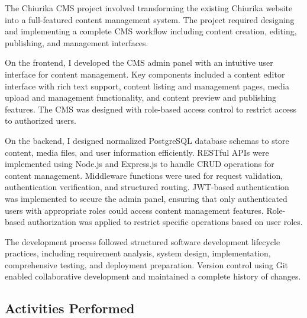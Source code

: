 The Chiurika CMS project involved transforming the existing Chiurika website into a full-featured content management system. The project required designing and implementing a complete CMS workflow including content creation, editing, publishing, and management interfaces.

On the frontend, I developed the CMS admin panel with an intuitive user interface for content management. Key components included a content editor interface with rich text support, content listing and management pages, media upload and management functionality, and content preview and publishing features. The CMS was designed with role-based access control to restrict access to authorized users.

On the backend, I designed normalized PostgreSQL database schemas to store content, media files, and user information efficiently. RESTful APIs were implemented using Node.js and Express.js to handle CRUD operations for content management. Middleware functions were used for request validation, authentication verification, and structured routing. JWT-based authentication was implemented to secure the admin panel, ensuring that only authenticated users with appropriate roles could access content management features. Role-based authorization was applied to restrict specific operations based on user roles.

The development process followed structured software development lifecycle practices, including requirement analysis, system design, implementation, comprehensive testing, and deployment preparation. Version control using Git enabled collaborative development and maintained a complete history of changes.

\subsection{Activities Performed}

